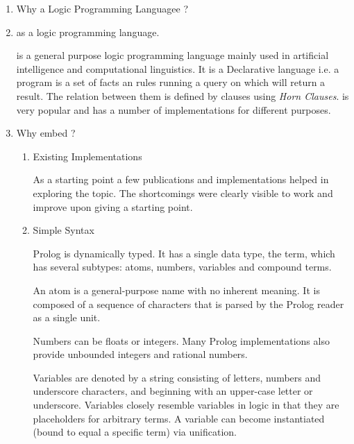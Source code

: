 \documentclass[thesis-solanki.tex]{subfiles}
\begin{document}
\begin{enumerate}
\item Why a Logic Programming Languagee ?

\item {} as a logic programming language.

 is a general purpose logic programming language mainly used in artificial intelligence and computational linguistics.  
It is a Declarative language i.e. a program is a set of facts an rules running a query on which will return a result. The relation
between them is defined by clauses using \textit{Horn Clauses}\cite{wikiprolog}.  is very popular and has a number of 
implementations \cite{website:comparisonofprologimplementationswiki} for different purposes. 

\item Why embed  ?

\begin{enumerate}


\item Existing Implementations

As a starting point a few publications and implementations helped in exploring the topic. The shortcomings were clearly visible to work and
improve upon giving a starting point.

\item Simple Syntax
\cite{wikiprolog}

Prolog is dynamically typed. It has a single data type, the term, which has several subtypes: atoms, numbers, variables and compound terms.

An atom is a general-purpose name with no inherent meaning. It is composed of a sequence of characters that is parsed by the Prolog
reader 
as a single unit.

Numbers can be floats or integers. Many Prolog
 implementations also provide unbounded integers and rational numbers.

Variables are denoted by a string consisting of letters, numbers and underscore characters, and beginning with an upper-case letter or 
underscore. Variables closely resemble variables in logic in that they are placeholders for arbitrary terms. A variable can become 
instantiated (bound to equal a specific term) via unification.


\end{enumerate}
\end{enumerate}
\end{document}
